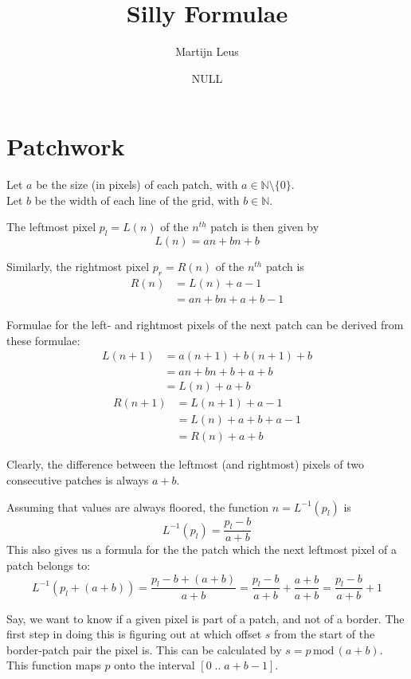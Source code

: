 \documentclass{article}
\newcommand{\natInterval}[2]{\left[#1\;..\;#2\right]}
\newcommand{\Mod}{\,\mathrm{mod}\,}
\begin{document}
\title{Silly Formulae}
\author{Martijn Leus}
\date{NULL}

\maketitle

\section{Patchwork}

Let $a$ be the size (in pixels) of each patch, with $a\in\mathbb{N}\setminus\{0\}$.\\
Let $b$ be the width of each line of the grid, with $b\in\mathbb{N}$.

The leftmost pixel $p_l=L(n)$ of the $n^{th}$ patch is then given by
$$L(n)=an + bn + b$$

Similarly, the rightmost pixel  $p_r=R(n)$ of the $n^{th}$ patch is
\begin{align*}
	R(n) &= L(n) + a - 1 \\
	&= an + bn + a + b - 1
\end{align*}

Formulae for the left- and rightmost pixels of the next patch can be derived from these formulae:
\begin{align*}
	L(n+1) &=a(n+1) + b(n+1) + b \\
	&= an + bn + b + a + b \\
	&= L(n) + a + b
\end{align*}
\begin{align*}
	R(n+1) &=L(n+1) + a - 1 \\
	&= L(n) + a + b + a - 1 \\
	&= R(n) + a + b
\end{align*}

Clearly, the difference between the leftmost (and rightmost) pixels of two consecutive patches is always $a + b$.

Assuming that values are always floored, the function $n=L^{-1}(p_l)$ is
$$L^{-1}(p_l)={\frac{p_l-b}{a+b}}$$
This also gives us a formula for the the patch which the next leftmost pixel of a patch belongs to:
$$L^{-1}(p_l + (a + b))=\frac{p_l-b+(a+b)}{a+b}=\frac{p_l-b}{a+b}+\frac{a+b}{a+b}=\frac{p_l-b}{a+b}+1$$

Say, we want to know if a given pixel is part of a patch, and not of a border. The first step in doing this is figuring out at which offset $s$ from the start of the border-patch pair the pixel is. This can be calculated by $s=p\Mod(a + b)$. This function maps $p$ onto the interval $\natInterval{0}{a+b-1}$.
\end{document}
